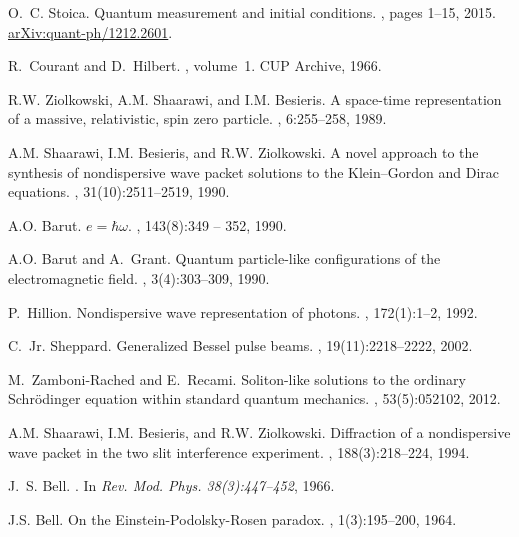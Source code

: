 \documentclass[12pt]{amsart}
\theoremstyle{definition}
\theoremstyle{plain}
\begin{document}
\begin{thebibliography}{10}
O.~C. Stoica.
\newblock Quantum measurement and initial conditions.
, pages 1--15, 2015.
\newblock \href{http://arxiv.org/abs/1212.2601}{arXiv:quant-ph/1212.2601}.

R.~Courant and D.~Hilbert.
, volume~1.
\newblock CUP Archive, 1966.

R.W. Ziolkowski, A.M. Shaarawi, and I.M. Besieris.
\newblock A space-time representation of a massive, relativistic, spin zero
  particle.
, 6:255--258, 1989.

A.M. Shaarawi, I.M. Besieris, and R.W. Ziolkowski.
\newblock A novel approach to the synthesis of nondispersive wave packet
  solutions to the {K}lein--{G}ordon and {D}irac equations.
, 31(10):2511--2519, 1990.

A.O. Barut.
\newblock $e=\hbar\omega$.
, 143(8):349 -- 352, 1990.

A.O. Barut and A.~Grant.
\newblock Quantum particle-like configurations of the electromagnetic field.
, 3(4):303--309, 1990.

P.~Hillion.
\newblock Nondispersive wave representation of photons.
, 172(1):1--2, 1992.

C.~Jr. Sheppard.
\newblock Generalized {B}essel pulse beams.
, 19(11):2218--2222, 2002.

M.~Zamboni-Rached and E.~Recami.
\newblock Soliton-like solutions to the ordinary {S}chr{\"o}dinger equation
  within standard quantum mechanics.
, 53(5):052102, 2012.

A.M. Shaarawi, I.M. Besieris, and R.W. Ziolkowski.
\newblock Diffraction of a nondispersive wave packet in the two slit
  interference experiment.
, 188(3):218--224, 1994.

J.~S. Bell.
.
\newblock In {\em {Rev. Mod. Phys. 38(3):447--452}}, 1966.

J.S. Bell.
\newblock On the {E}instein-{P}odolsky-{R}osen paradox.
, 1(3):195--200, 1964.


\end{thebibliography}
\end{document}
